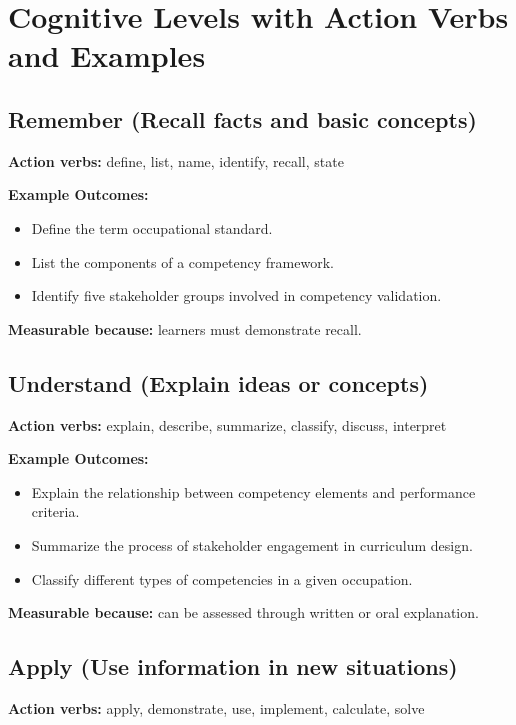 \documentclass[12pt]{article}
\begin{document}
\section{Cognitive Levels with Action Verbs and Examples}

\subsection{Remember (Recall facts and basic concepts)}

\textbf{Action verbs:} define, list, name, identify, recall, state

\textbf{Example Outcomes:}

\begin{itemize}
    \item Define the term occupational standard.
    \item List the components of a competency framework.
    \item Identify five stakeholder groups involved in competency validation.
\end{itemize}

\textbf{Measurable because:} learners must demonstrate recall.

\subsection{Understand (Explain ideas or concepts)}

\textbf{Action verbs:} explain, describe, summarize, classify, discuss, interpret

\textbf{Example Outcomes:}

\begin{itemize}
    \item Explain the relationship between competency elements and performance criteria.
    \item Summarize the process of stakeholder engagement in curriculum design.
    \item Classify different types of competencies in a given occupation.
\end{itemize}

\textbf{Measurable because:} can be assessed through written or oral explanation.

\subsection{Apply (Use information in new situations)}

\textbf{Action verbs:} apply, demonstrate, use, implement, calculate, solve
\end{document}
